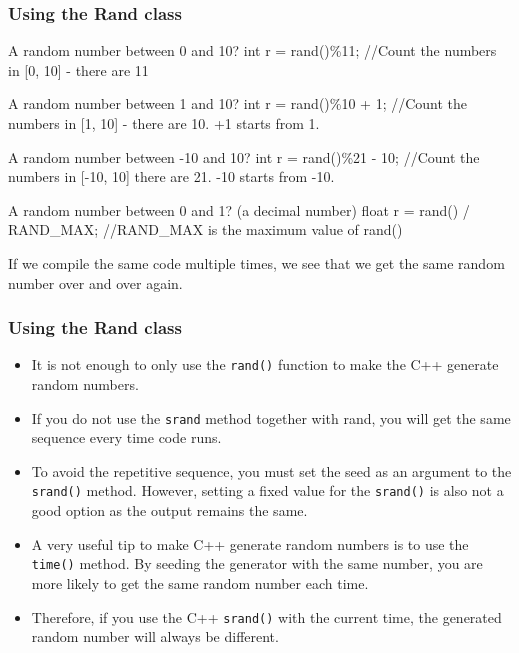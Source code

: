 \documentclass{if-beamer}
\begin{document}
\begin{frame}
\frametitle{Using the Rand class}
\begin{block}{A random number between 0 and 10?}
	int r = rand()\%11;  //Count the numbers in [0, 10] - there are 11
\end{block}
\begin{block}{A random number between 1 and 10?}
	int r = rand()\%10 + 1;  //Count the numbers in [1, 10] - there are 10. +1 starts from 1.
\end{block}
\begin{block}{A random number between -10 and 10?}
	int r = rand()\%21 - 10; //Count the numbers in [-10, 10] there are 21. -10 starts from -10.
\end{block}
\begin{block}{A random number between 0 and 1? (a decimal number)}
	float r = rand() / RAND\_MAX; //RAND\_MAX is the maximum value of rand() 
\end{block}

If we compile the same code multiple times, we see that we get the same random number over and over again.
\end{frame}

\begin{frame}
\frametitle{Using the Rand class}
\begin{itemize}
	\item It is not enough to only use the \texttt{rand()} function to make the C++ generate random numbers.\\\vspace{4.5pt}
	\item If you do not use the \texttt{srand} method together with rand, you will get the same sequence every time code runs.\\\vspace{4.5pt}
	\item To avoid the repetitive sequence, you must set the seed as an argument to the \texttt{srand()} method. However, setting a fixed value for the \texttt{srand()} is also not a good option as the output remains the same.\\\vspace{4.5pt}
	\item A very useful tip to make C++ generate random numbers is to use the \texttt{time()} method. By seeding the generator with the same number, you are more likely to get the same random number each time.\\\vspace{4.5pt}
	\item Therefore, if you use the C++ \texttt{srand()} with the current time, the generated random number will always be different.
\end{itemize}

\end{frame}
\end{document}
